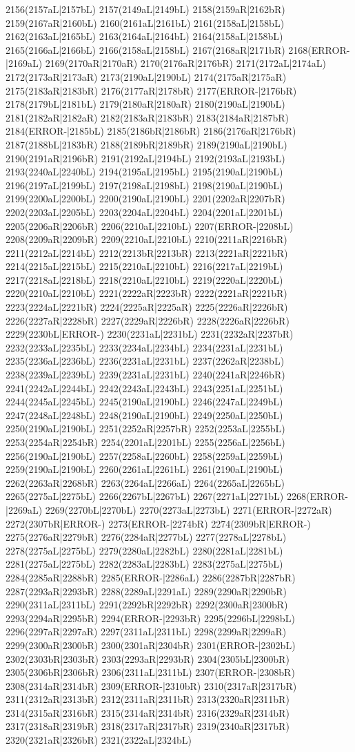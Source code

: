2156(2157aL|2157bL) 2157(2149aL|2149bL) 2158(2159aR|2162bR) 2159(2167aR|2160bL) 2160(2161aL|2161bL) 2161(2158aL|2158bL) 2162(2163aL|2165bL) 2163(2164aL|2164bL) 2164(2158aL|2158bL) 2165(2166aL|2166bL) 2166(2158aL|2158bL) 2167(2168aR|2171bR) 2168(ERROR-|2169aL) 2169(2170aR|2170aR) 2170(2176aR|2176bR) 2171(2172aL|2174aL) 2172(2173aR|2173aR) 2173(2190aL|2190bL) 2174(2175aR|2175aR) 2175(2183aR|2183bR) 2176(2177aR|2178bR) 2177(ERROR-|2176bR) 2178(2179bL|2181bL) 2179(2180aR|2180aR) 2180(2190aL|2190bL) 2181(2182aR|2182aR) 2182(2183aR|2183bR) 2183(2184aR|2187bR) 2184(ERROR-|2185bL) 2185(2186bR|2186bR) 2186(2176aR|2176bR) 2187(2188bL|2183bR) 2188(2189bR|2189bR) 2189(2190aL|2190bL) 2190(2191aR|2196bR) 2191(2192aL|2194bL) 2192(2193aL|2193bL) 2193(2240aL|2240bL) 2194(2195aL|2195bL) 2195(2190aL|2190bL) 2196(2197aL|2199bL) 2197(2198aL|2198bL) 2198(2190aL|2190bL) 2199(2200aL|2200bL) 2200(2190aL|2190bL) 2201(2202aR|2207bR) 2202(2203aL|2205bL) 2203(2204aL|2204bL) 2204(2201aL|2201bL) 2205(2206aR|2206bR) 2206(2210aL|2210bL) 2207(ERROR-|2208bL) 2208(2209aR|2209bR) 2209(2210aL|2210bL) 2210(2211aR|2216bR) 2211(2212aL|2214bL) 2212(2213bR|2213bR) 2213(2221aR|2221bR) 2214(2215aL|2215bL) 2215(2210aL|2210bL) 2216(2217aL|2219bL) 2217(2218aL|2218bL) 2218(2210aL|2210bL) 2219(2220aL|2220bL) 2220(2210aL|2210bL) 2221(2222aR|2223bR) 2222(2221aR|2221bR) 2223(2224aL|2221bR) 2224(2225aR|2225aR) 2225(2226aR|2226bR) 2226(2227aR|2228bR) 2227(2229aR|2226bR) 2228(2226aR|2226bR) 2229(2230bL|ERROR-) 2230(2231aL|2231bL) 2231(2232aR|2237bR) 2232(2233aL|2235bL) 2233(2234aL|2234bL) 2234(2231aL|2231bL) 2235(2236aL|2236bL) 2236(2231aL|2231bL) 2237(2262aR|2238bL) 2238(2239aL|2239bL) 2239(2231aL|2231bL) 2240(2241aR|2246bR) 2241(2242aL|2244bL) 2242(2243aL|2243bL) 2243(2251aL|2251bL) 2244(2245aL|2245bL) 2245(2190aL|2190bL) 2246(2247aL|2249bL) 2247(2248aL|2248bL) 2248(2190aL|2190bL) 2249(2250aL|2250bL) 2250(2190aL|2190bL) 2251(2252aR|2257bR) 2252(2253aL|2255bL) 2253(2254aR|2254bR) 2254(2201aL|2201bL) 2255(2256aL|2256bL) 2256(2190aL|2190bL) 2257(2258aL|2260bL) 2258(2259aL|2259bL) 2259(2190aL|2190bL) 2260(2261aL|2261bL) 2261(2190aL|2190bL) 2262(2263aR|2268bR) 2263(2264aL|2266aL) 2264(2265aL|2265bL) 2265(2275aL|2275bL) 2266(2267bL|2267bL) 2267(2271aL|2271bL) 2268(ERROR-|2269aL) 2269(2270bL|2270bL) 2270(2273aL|2273bL) 2271(ERROR-|2272aR) 2272(2307bR|ERROR-) 2273(ERROR-|2274bR) 2274(2309bR|ERROR-) 2275(2276aR|2279bR) 2276(2284aR|2277bL) 2277(2278aL|2278bL) 2278(2275aL|2275bL) 2279(2280aL|2282bL) 2280(2281aL|2281bL) 2281(2275aL|2275bL) 2282(2283aL|2283bL) 2283(2275aL|2275bL) 2284(2285aR|2288bR) 2285(ERROR-|2286aL) 2286(2287bR|2287bR) 2287(2293aR|2293bR) 2288(2289aL|2291aL) 2289(2290aR|2290bR) 2290(2311aL|2311bL) 2291(2292bR|2292bR) 2292(2300aR|2300bR) 2293(2294aR|2295bR) 2294(ERROR-|2293bR) 2295(2296bL|2298bL) 2296(2297aR|2297aR) 2297(2311aL|2311bL) 2298(2299aR|2299aR) 2299(2300aR|2300bR) 2300(2301aR|2304bR) 2301(ERROR-|2302bL) 2302(2303bR|2303bR) 2303(2293aR|2293bR) 2304(2305bL|2300bR) 2305(2306bR|2306bR) 2306(2311aL|2311bL) 2307(ERROR-|2308bR) 2308(2314aR|2314bR) 2309(ERROR-|2310bR) 2310(2317aR|2317bR) 2311(2312aR|2313bR) 2312(2311aR|2311bR) 2313(2320aR|2311bR) 2314(2315aR|2316bR) 2315(2314aR|2314bR) 2316(2329aR|2314bR) 2317(2318aR|2319bR) 2318(2317aR|2317bR) 2319(2340aR|2317bR) 2320(2321aR|2326bR) 2321(2322aL|2324bL) 